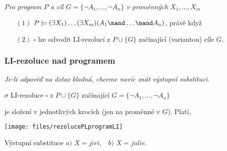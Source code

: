     {\bf {}}\ \ {\it Pro program $P$ a cíl $G=\{\neg A_1, \dots, \neg A_n\}$ v proměnných $X_1,\dots,X_m$
    
    \vspace{-0mm}
    \begin{enumerate}
    \item[$(1)$] $P \models (\exists X_1)\dots(\exists X_m)(A_1\mand \dots \mand A_n)$, právě když
    \smallskip
    
    \item[$(2)$] $\square$ lze odvodit LI-rezolucí z $P\cup\{G\}$ začínající (variantou) cíle $G$.
    \end{enumerate}}
    
    
    
    \subsubsection*{LI-rezoluce nad programem}
    {\it Je-li odpověď na dotaz kladná, chceme navíc znát výstupní substituci.}
    \medskip
    
     $\sigma$ LI-rezoluce $\square$ z $P\cup\{G\}$ začínající $G=\{\neg A_1,\dots,\neg A_n\}$
    \smallskip
    
    je složení  v jednotlivých krocích (jen na proměnné v $G$). Platí,
    \vspace{-2mm}
    
    \vspace{-2mm}
    
    \centerline{\texttt{[image: files/rezolucePLprogramLI]}}
    \bigskip
    
    Výstupní substituce $a)$ $X=jiri$,\ \ $b)$ $X=julie$.
    
    
